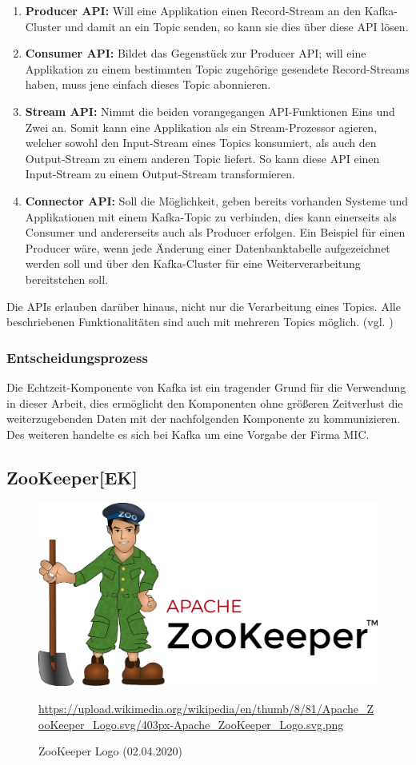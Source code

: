 \begin{enumerate}
  \item \textbf{Producer API:} Will eine Applikation einen Record-Stream an den Kafka-Cluster und damit an ein Topic senden, so kann sie dies über diese API lösen.
  \item \textbf{Consumer API:} Bildet das Gegenstück zur Producer API; will eine Applikation zu einem bestimmten Topic zugehörige gesendete Record-Streams haben, muss jene einfach dieses Topic abonnieren.
  \item \textbf{Stream API: } Nimmt die beiden vorangegangen API-Funktionen Eins und Zwei an. Somit kann eine Applikation als ein Stream-Prozessor agieren, welcher sowohl den Input-Stream eines Topics konsumiert, als auch den Output-Stream zu einem anderen Topic liefert. So kann diese API einen Input-Stream zu einem Output-Stream transformieren.
  \item \textbf{Connector API:} Soll die Möglichkeit, geben bereits vorhanden Systeme und Applikationen mit einem Kafka-Topic zu verbinden, dies kann einerseits als Consumer und andererseits auch als Producer erfolgen. Ein Beispiel für einen Producer  wäre, wenn jede Änderung einer Datenbanktabelle aufgezeichnet werden soll und über den Kafka-Cluster für eine Weiterverarbeitung bereitstehen soll.
\end{enumerate}
Die APIs erlauben darüber hinaus, nicht nur die Verarbeitung eines Topics. Alle beschriebenen Funktionalitäten sind auch mit mehreren Topics möglich.
(vgl. \cite{Kafka-Introduction})
\subsubsection{Entscheidungsprozess}
Die Echtzeit-Komponente von Kafka ist ein tragender Grund für die Verwendung in dieser Arbeit, dies ermöglicht den Komponenten ohne größeren Zeitverlust die weiterzugebenden Daten mit der nachfolgenden Komponente zu kommunizieren. Des weiteren handelte es sich bei Kafka um eine Vorgabe der Firma MIC.

\subsection{ZooKeeper[EK]}
\begin{figure}[H]
    \centering
    \includegraphics[scale=0.25]{images/zookeeper-logo.png}
    \caption{ZooKeeper Logo (02.04.2020)}
    \url{https://upload.wikimedia.org/wikipedia/en/thumb/8/81/Apache_ZooKeeper_Logo.svg/403px-Apache_ZooKeeper_Logo.svg.png}
\end{figure}
